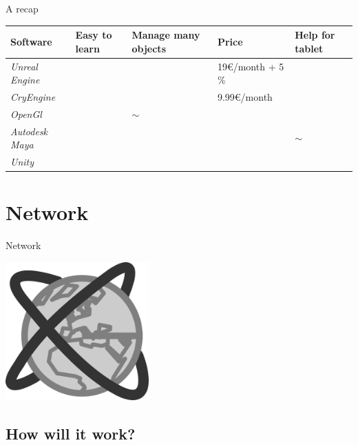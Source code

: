 \documentclass[a4paper,10pt]{beamer}
\begin{document}
			\begin{frame}{A recap}
				\begin{tabular}{|M{50pt}|M{30pt}|M{45pt}|M{80pt}|M{30pt}|}
					\hline
					\textbf{Software} & \textbf{Easy to learn} & \textbf{Manage many objects} & \textbf{Price} & \textbf{Help for tablet}\\
					\hline
					\textit{Unreal Engine} & \color{green}{\checkmark} & \color{green}{\checkmark} &19\euro/month + 5 \% & \color{red}{$\times$}\\
					\hline
					\textit{CryEngine} & \color{green}{\checkmark} & \color{green}{\checkmark} & 9.99\euro/month & \color{orange}{$\sim$}\\
					\hline
					\textit{OpenGl} & \color{red}{$\times$} & $\sim$ & \color{green}{0\euro} & \color{red}{$\times$}\\
					\hline
					\textit{Autodesk Maya} & \color{red}{$\times$} & \color{green}{\checkmark} & \color{red}{\$185.00/month} & $\sim$\\
					\hline
					\textit{Unity} & \color{green}{\checkmark} & \color{green}{\checkmark} & \color{green}{0\euro : free licence} & \color{green}{\checkmark} \\
					\hline
				\end{tabular}
			\end{frame}
			
	\section{Network}
			
			\begin{frame}{Network}
				\centerline{\includegraphics[height=150pt]{images/network/network.png}}
			\end{frame}
			
		\subsection{How will it work?}
		
\end{document}
